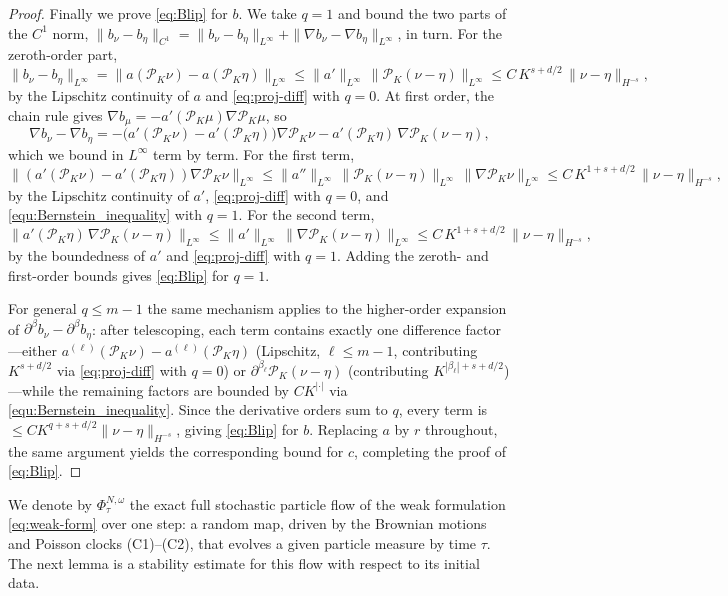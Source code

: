 \documentclass[a4paper,fleqn]{cas-sc}
\theoremstyle{definition}
\theoremstyle{remark}
\begin{document}
\begin{proof}
Finally we prove \eqref{eq:Blip} for $b$. We take $q=1$ and
bound the two parts of the $C^1$ norm,
$\|b_\nu-b_\eta\|_{C^1}=\|b_\nu-b_\eta\|_{L^\infty}+\|\nabla b_\nu-\nabla b_\eta\|_{L^\infty}$,
in turn. For the zeroth-order part,
\[
\|b_\nu-b_\eta\|_{L^\infty}
=\|a(\mathcal P_K\nu)-a(\mathcal P_K\eta)\|_{L^\infty}
\le\|a'\|_{L^\infty}\,\|\mathcal P_K(\nu-\eta)\|_{L^\infty}
\le C\,K^{s+d/2}\,\|\nu-\eta\|_{H^{-s}},
\]
by the Lipschitz continuity of $a$ and \eqref{eq:proj-diff} with $q=0$.
At first order, the chain rule gives
$\nabla b_\mu=-a'(\mathcal P_K\mu)\nabla\mathcal P_K\mu$, so
\[
\nabla b_\nu-\nabla b_\eta
=-\bigl(a'(\mathcal P_K\nu)-a'(\mathcal P_K\eta)\bigr)\nabla\mathcal P_K\nu
 -a'(\mathcal P_K\eta)\,\nabla\mathcal P_K(\nu-\eta),
\]
which we bound in $L^\infty$ term by term. For the first term,
\[
\bigl\|(a'(\mathcal P_K\nu)-a'(\mathcal P_K\eta))\nabla\mathcal P_K\nu\bigr\|_{L^\infty}
\le\|a''\|_{L^\infty}\,\|\mathcal P_K(\nu-\eta)\|_{L^\infty}\,
   \|\nabla\mathcal P_K\nu\|_{L^\infty}
\le C\,K^{1+s+d/2}\,\|\nu-\eta\|_{H^{-s}},
\]
by the Lipschitz continuity of $a'$, \eqref{eq:proj-diff} with $q=0$, and
\eqref{equ:Bernstein_inequality} with $q=1$. For the second term,
\[
\bigl\|a'(\mathcal P_K\eta)\,\nabla\mathcal P_K(\nu-\eta)\bigr\|_{L^\infty}
\le\|a'\|_{L^\infty}\,\|\nabla\mathcal P_K(\nu-\eta)\|_{L^\infty}
\le C\,K^{1+s+d/2}\,\|\nu-\eta\|_{H^{-s}},
\]
by the boundedness of $a'$ and \eqref{eq:proj-diff} with $q=1$. Adding
the zeroth- and first-order bounds gives \eqref{eq:Blip} for $q=1$.

For general $q\le m-1$ the same mechanism applies to the higher-order expansion
of $\partial^\beta b_\nu-\partial^\beta b_\eta$: after telescoping, each term
contains exactly one difference factor---either
$a^{(\ell)}(\mathcal P_K\nu)-a^{(\ell)}(\mathcal P_K\eta)$ (Lipschitz,
$\ell\le m-1$, contributing $K^{s+d/2}$ via \eqref{eq:proj-diff} with $q=0$) or
$\partial^{\beta_\ell}\mathcal P_K(\nu-\eta)$ (contributing $K^{|\beta_\ell|+s+d/2}$)---while
the remaining factors are bounded by $CK^{|\cdot|}$ via
\eqref{equ:Bernstein_inequality}. Since the derivative orders sum to $q$, every
term is $\le CK^{q+s+d/2}\|\nu-\eta\|_{H^{-s}}$, giving \eqref{eq:Blip} for $b$.
Replacing $a$ by $r$ throughout, the same argument yields the
corresponding bound for $c$, completing the proof of \eqref{eq:Blip}.
\end{proof}

We denote by $\Phi^{N,\omega}_\tau$ the exact full stochastic particle flow of the
weak formulation \eqref{eq:weak-form} over one step: a random map, driven by the
Brownian motions and Poisson clocks (C1)--(C2), that evolves a given particle
measure by time $\tau$. The next lemma is a stability estimate for this flow with
respect to its initial data.
\end{document}
